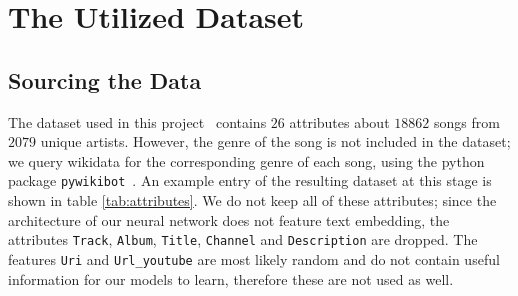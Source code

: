 \documentclass[
  12pt,
  bibliography=totoc,     %
  captions=tableheading,  %
  titlepage=firstiscover, %
]{scrartcl}
\begin{document}
\section{The Utilized Dataset}
\subsection{Sourcing the Data}
The dataset used in this project~\cite{Datensatz} contains $26$ attributes about $18862$ songs from $2079$ unique artists.
However, the genre of the song is not included in the dataset; we query wikidata for the corresponding genre of each song,
using the python package \texttt{pywikibot}~\cite{pywikibot}. An example entry of the resulting dataset at this stage
is shown in table \ref{tab:attributes}. We do not keep all of these attributes; since the architecture of our
neural network does not feature text embedding, the attributes \texttt{Track}, \texttt{Album}, \texttt{Title}, \texttt{Channel} and
\texttt{Description} are dropped. The features \texttt{Uri} and \texttt{Url\_youtube} are most likely random and do not contain
useful information for our models to learn, therefore these are not used as well.
\FloatBarrier
\end{document}
